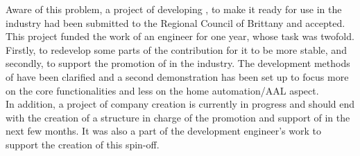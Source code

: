 Aware of this problem, a project of developing \enti{}, to make it ready for use in the industry had been submitted to the Regional Council of Brittany and accepted. This project funded the work of an engineer for one year, whose task was twofold. Firstly, to redevelop some parts of the contribution for it to be more stable, and secondly, to support the promotion of \enti{} in the industry. The development methods of \enti{} have been clarified and a second demonstration has been set up to focus more on the core functionalities and less on the home automation/AAL aspect.\\

In addition, a project of company creation is currently in progress and should end with the creation of a structure in charge of the promotion and support of \enti{} in the next few months. It was also a part of the development engineer's work to support the creation of this spin-off. 






